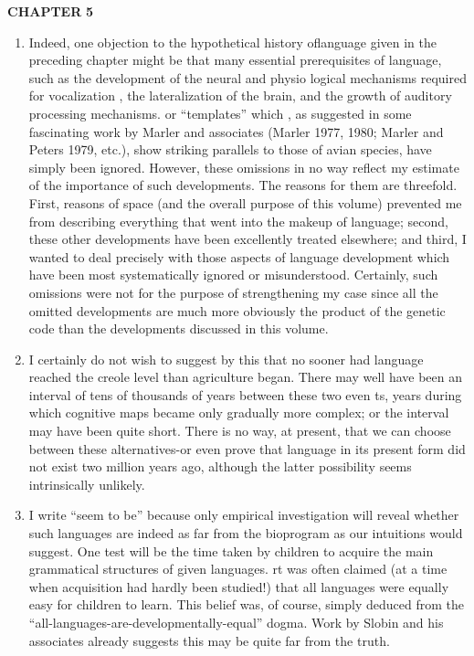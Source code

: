 \textbf{CHAPTER} \textbf{5}
\begin{enumerate}
\item Indeed, one objection to the hypothetical history oflanguage given in the preceding chapter might be that many essential prerequi\-sites of language, such as the development of the neural and physio%
logical mechanisms required for vocalization , the lateralization of the brain, and the growth of auditory processing mechanisms. or ``tem\-plates'' which , as suggested in some fascinating work by Marler and associates (Marler 1977, 1980; Marler and Peters 1979, etc.), show striking parallels to those of avian species, have simply been ignored. However, these omissions in no way reflect my estimate of the impor\-tance of such developments. The reasons for them are threefold. First, reasons of space (and the overall purpose of this volume) pre\-vented me from describing everything that went into the makeup of language; second, these other developments have been excellently treated elsewhere; and third, I wanted to deal precisely with those aspects of language development which have been most systematically ignored or misunderstood. Certainly, such omissions were not for the purpose of strengthening my case since all the omitted developments are much more obviously the product of the genetic code than the developments discussed in this volume. 
\item I certainly do not wish to suggest by this that no sooner had language reached the creole level than agriculture began. There may well have been an interval of tens of thousands of years between these two even ts, years during which cognitive maps became only gradually more complex; or the interval may have been quite short. There is no way, at present, that we can choose between these alternatives-or even prove that language in its present form did not exist two million years ago, although the latter possibility seems intrinsically unlikely.
\item I write ``seem to be'' because only empirical investigation will reveal whether such languages are indeed as far from the bio\-program as our intuitions would suggest. One test will be the time taken by children to acquire the main grammatical structures of given 
languages. rt was often claimed (at a time when acquisition had hardly
been studied!) that all languages were equally easy for children to learn. This belief was, of course, simply deduced from the ``all-languages-are-developmentally-equal'' dogma. Work by Slobin and his associates already suggests this may be quite far from the truth.
\end{enumerate}





  


  
 